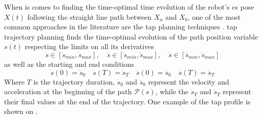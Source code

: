 When is comes to finding the time-optimal time evolution of the robot's \gls{cs} pose $X(t)$ following the straight line path between $X_a$ and $X_b$, one of the most common approaches in the literature are the \gls{tap} planning techniques \cite[Chapter 9.2.2.2]{modernrobotics}. \gls{tap} trajectory planning finds the time-optimal evolution of the path position variable $s(t)$ respecting the limits on all its derivatives
\begin{equation}
    \dot{s} \in [\dot{s}_{min}, \dot{s}_{max}], \quad
\ddot{s}\in [\ddot{s}_{min}, \ddot{s}_{max}], \quad
\dddot{s}\in [\dddot{s}_{min}, \dddot{s}_{max}] 
\label{eq:s_limits}
\end{equation}
as well as the starting and end conditions 
\begin{equation}
    \dot{s}(0) = \dot{s}_{0} \quad \dot{s}(T) = \dot{s}_{T} \quad
    \ddot{s}(0) = \ddot{s}_{0} \quad \ddot{s}(T) = \ddot{s}_{T}
\end{equation}
Where $T$ is the trajectory duration, $\dot{s}_{0}$ and $\ddot{s}_{0}$ represent the velocity and acceleration at the beginning of the path $\mathscr{P}(s)$, while the $\dot{s}_{T}$ and $\ddot{s}_{T}$ represent their final values at the end of the trajectory. One example of the \gls{tap} profile is shown on .


